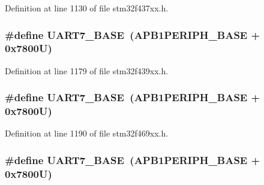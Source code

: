 Definition at line 1130 of file stm32f437xx.\+h.

\subsubsection[{\texorpdfstring{U\+A\+R\+T7\+\_\+\+B\+A\+SE}{UART7_BASE}}]{\setlength{\rightskip}{0pt plus 5cm}\#define U\+A\+R\+T7\+\_\+\+B\+A\+SE~({\bf A\+P\+B1\+P\+E\+R\+I\+P\+H\+\_\+\+B\+A\+SE} + 0x7800\+U)}\hypertarget{group___peripheral__memory__map_ga3150e4b10ec876c0b20f22de12a8fa40}{}\label{group___peripheral__memory__map_ga3150e4b10ec876c0b20f22de12a8fa40}


Definition at line 1179 of file stm32f439xx.\+h.

\subsubsection[{\texorpdfstring{U\+A\+R\+T7\+\_\+\+B\+A\+SE}{UART7_BASE}}]{\setlength{\rightskip}{0pt plus 5cm}\#define U\+A\+R\+T7\+\_\+\+B\+A\+SE~({\bf A\+P\+B1\+P\+E\+R\+I\+P\+H\+\_\+\+B\+A\+SE} + 0x7800\+U)}\hypertarget{group___peripheral__memory__map_ga3150e4b10ec876c0b20f22de12a8fa40}{}\label{group___peripheral__memory__map_ga3150e4b10ec876c0b20f22de12a8fa40}


Definition at line 1190 of file stm32f469xx.\+h.

\subsubsection[{\texorpdfstring{U\+A\+R\+T7\+\_\+\+B\+A\+SE}{UART7_BASE}}]{\setlength{\rightskip}{0pt plus 5cm}\#define U\+A\+R\+T7\+\_\+\+B\+A\+SE~({\bf A\+P\+B1\+P\+E\+R\+I\+P\+H\+\_\+\+B\+A\+SE} + 0x7800\+U)}\hypertarget{group___peripheral__memory__map_ga3150e4b10ec876c0b20f22de12a8fa40}{}\label{group___peripheral__memory__map_ga3150e4b10ec876c0b20f22de12a8fa40}


